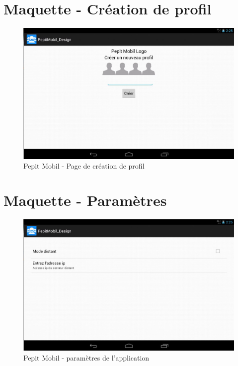 \section*{Maquette - Création de profil}
\begin{figure}[H]
\begin{center}
\includegraphics[width=15cm]{images/maquettes_creer_user}
\end{center}
\caption{Pepit Mobil - Page de création de profil}
\label{Pepit Mobil - Page de création de profil}
\end{figure}

\section*{Maquette - Paramètres}
\begin{figure}[H]
\begin{center}
\includegraphics[width=15cm]{images/maquettes_parametres}
\end{center}
\caption{Pepit Mobil - paramètres de l'application}
\label{Pepit Mobil - paramètres de l'application}
\end{figure}